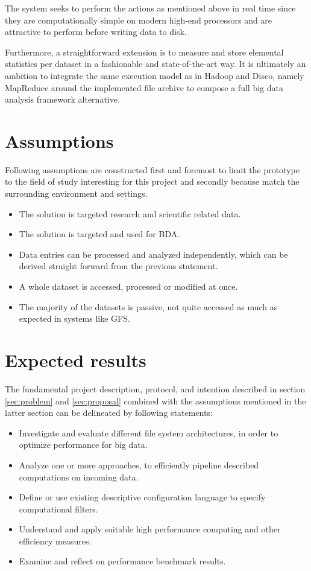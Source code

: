 The system seeks to perform the actions as mentioned above in real time since they are computationally simple on modern high-end processors and are attractive to perform before writing data to disk. 
\newline

Furthermore, a straightforward extension is to measure and store elemental statistics per dataset in a fashionable and state-of-the-art way. It is ultimately an ambition to integrate the same execution model as in \eg Hadoop and Disco, namely MapReduce around the implemented file archive to compose a full big data analysis framework alternative.

\section{Assumptions} \label{sec:assumption}
Following assumptions are constructed first and foremost to limit the prototype to the field of study interesting for this project and secondly because match the surrounding environment and settings.

\begin{itemize}
	\item The solution is targeted research and scientific related data. 
	\item The solution is targeted and used for BDA.
	\item Data entries can be processed and analyzed independently, which can be derived straight forward from the previous statement.
	\item A whole dataset is accessed, processed or modified at once.
	\item The majority of the datasets is passive, \eg not quite accessed as much as expected in systems like GFS.
\end{itemize}

\section{Expected results} \label{sec:expected-results}
The fundamental project description, protocol, and intention described in \eg section \ref{sec:problem} and \ref{sec:proposal} combined with the assumptions mentioned in the latter section can be delineated by following statements:

\begin{itemize}
	\item Investigate and evaluate different file system architectures, in order to optimize performance for big data.	
	\item Analyze one or more approaches, to efficiently pipeline described computations on incoming data.
	\item Define or use existing descriptive configuration language to specify computational filters.
	\item Understand and apply suitable high performance computing and other efficiency measures.
	\item Examine and reflect on performance benchmark results.
\end{itemize}

\section{}

